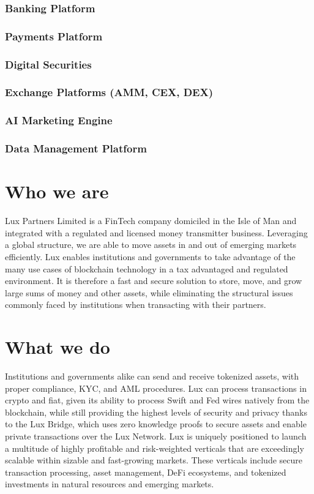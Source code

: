 \documentclass[11pt]{article}
\begin{document}
\subsubsection{Banking Platform}

\subsubsection{Payments Platform}

\subsubsection{Digital Securities}

\subsubsection{Exchange Platforms (AMM, CEX, DEX)}

\subsubsection{AI Marketing Engine}

\subsubsection{Data Management Platform}

\section{Who we are}

Lux Partners Limited is a FinTech company domiciled in the Isle of Man and integrated with a regulated and licensed money transmitter business. Leveraging a global structure, we are able to move assets in and out of emerging markets efficiently. Lux enables institutions and governments to take advantage of the many use cases of blockchain technology in a tax advantaged and regulated environment. It is therefore a fast and secure solution to store, move, and grow large sums of money and other assets, while eliminating the structural issues commonly faced by institutions when transacting with their partners.


\section{What we do}

Institutions and governments alike can send and receive tokenized assets, with proper compliance, KYC, and AML procedures. Lux can process transactions in crypto and fiat, given its ability to process Swift and Fed wires natively from the blockchain, while still providing the highest levels of security and privacy thanks to the Lux Bridge, which uses zero knowledge proofs to secure assets and enable private transactions over the Lux Network. Lux is uniquely positioned to launch a multitude of highly profitable and risk-weighted verticals that are exceedingly scalable within sizable and fast-growing markets. These verticals include secure transaction processing, asset management, DeFi ecosystems, and tokenized investments in natural resources and emerging markets.
\end{document}
